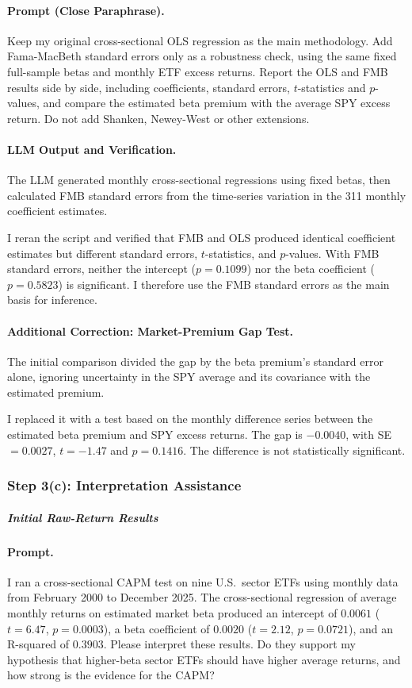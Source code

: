 \paragraph{Prompt (Close Paraphrase).} Keep my original cross-sectional OLS
regression as the main methodology. Add Fama-MacBeth standard errors only as a
robustness check, using the same fixed full-sample betas and monthly ETF excess
returns. Report the OLS and FMB results side by side, including coefficients,
standard errors, $t$-statistics and $p$-values, and compare the estimated beta
premium with the average SPY excess return. Do not add Shanken, Newey-West or
other extensions.

\paragraph{LLM Output and Verification.} The LLM generated monthly
cross-sectional regressions using fixed betas, then calculated FMB standard
errors from the time-series variation in the 311 monthly coefficient estimates.

I reran the script and verified that FMB and OLS produced identical coefficient
estimates but different standard errors, $t$-statistics, and $p$-values. With
FMB standard errors, neither the intercept ($p = 0.1099$) nor the beta
coefficient ($p = 0.5823$) is significant. I therefore use the FMB standard
errors as the main basis for inference.

\paragraph{Additional Correction: Market-Premium Gap Test.} The initial
comparison divided the gap by the beta premium's standard error alone, ignoring
uncertainty in the SPY average and its covariance with the estimated premium.

I replaced it with a test based on the monthly difference series between the
estimated beta premium and SPY excess returns. The gap is $-0.0040$, with
SE $= 0.0027$, $t = -1.47$ and $p = 0.1416$. The difference is not
statistically significant.

\subsubsection*{Step 3(c): Interpretation Assistance}

\subparagraph*{Initial Raw-Return Results}

\paragraph{Prompt.} I ran a cross-sectional CAPM test on nine U.S.\ sector ETFs
using monthly data from February 2000 to December 2025. The cross-sectional
regression of average monthly returns on estimated market beta produced an
intercept of $0.0061$ ($t = 6.47$, $p = 0.0003$), a beta coefficient of
$0.0020$ ($t = 2.12$, $p = 0.0721$), and an R-squared of $0.3903$. Please
interpret these results. Do they support my hypothesis that higher-beta sector
ETFs should have higher average returns, and how strong is the evidence for the
CAPM?

